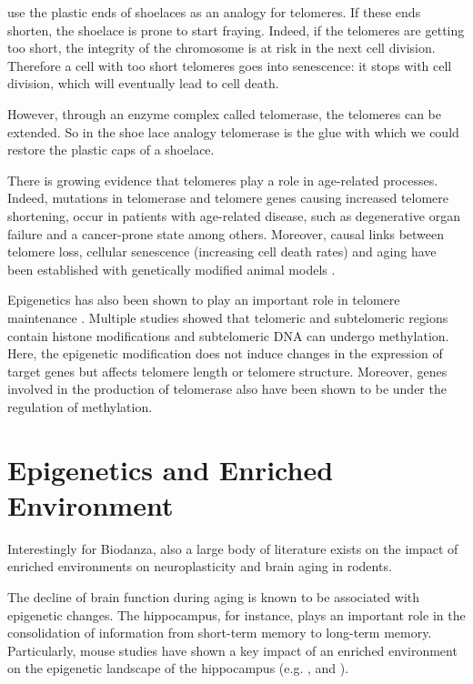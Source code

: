 \documentclass[
  11pt,
]{book}
\begin{document}
\citet{BlackburnEpel2017} use the plastic ends of shoelaces as an analogy for telomeres. If these ends shorten, the shoelace is prone to start fraying. Indeed, if the telomeres are getting too short, the integrity of the chromosome is at risk in the next cell division. Therefore a cell with too short telomeres goes into senescence: it stops with cell division, which will eventually lead to cell death.

However, through an enzyme complex called telomerase, the telomeres can be extended. So in the shoe lace analogy telomerase is the glue with which we could restore the plastic caps of a shoelace.

There is growing evidence that telomeres play a role in age-related processes. Indeed, mutations in telomerase and telomere genes causing increased telomere shortening, occur in patients with age-related disease, such as degenerative organ failure and a cancer-prone state among others. Moreover, causal links between telomere loss, cellular senescence (increasing cell death rates) and aging have been established with genetically modified animal models \citep{Adwan2018}.

Epigenetics has also been shown to play an important role in telomere maintenance \citep{Adwan2018}.
Multiple studies showed that telomeric and subtelomeric regions contain histone modifications and subtelomeric DNA can undergo methylation.
Here, the epigenetic modification does not induce changes in the expression of target genes but affects telomere length or telomere structure.
Moreover, genes involved in the production of telomerase also have been shown to be under the regulation of methylation.

\hypertarget{epigenetics-and-enriched-environment}{%
\section{Epigenetics and Enriched Environment}\label{epigenetics-and-enriched-environment}}

Interestingly for Biodanza, also a large body of literature exists on the impact of enriched environments on neuroplasticity and brain aging in rodents.

The decline of brain function during aging is known to be associated with epigenetic changes. The hippocampus, for instance, plays an important role in the consolidation of information from short-term memory to long-term memory. Particularly, mouse studies have shown a key impact of an enriched environment on the epigenetic landscape of the hippocampus (e.g. \citet{zocher2021}, and \citet{grinan2016}).
\end{document}
